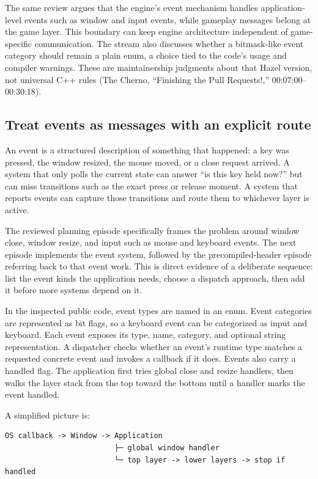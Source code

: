The same review argues that the engine's event mechanism handles application-level events such as window and input events, while gameplay messages belong at the game layer. This boundary can keep engine architecture independent of game-specific communication. The stream also discusses whether a bitmask-like event category should remain a plain enum, a choice tied to the code's usage and compiler warnings. These are maintainership judgments about that Hazel version, not universal C++ rules (The Cherno, ``Finishing the Pull Requests!,'' 00:07:00--00:30:18).

\subsection{Treat events as messages with an explicit route}\label{05-engine-i-ch013-treat-events-as-messages-with-an-explicit-route}

An event is a structured description of something that happened: a key was pressed, the window resized, the mouse moved, or a close request arrived. A system that only polls the current state can answer ``is this key held now?'' but can miss transitions such as the exact press or release moment. A system that reports events can capture those transitions and route them to whichever layer is active.

The reviewed planning episode specifically frames the problem around window close, window resize, and input such as mouse and keyboard events. The next episode implements the event system, followed by the precompiled-header episode referring back to that event work. This is direct evidence of a deliberate sequence: list the event kinds the application needs, choose a dispatch approach, then add it before more systems depend on it.

In the inspected public code, event types are named in an enum. Event categories are represented as bit flags, so a keyboard event can be categorized as input and keyboard. Each event exposes its type, name, category, and optional string representation. A dispatcher checks whether an event's runtime type matches a requested concrete event and invokes a callback if it does. Events also carry a handled flag. The application first tries global close and resize handlers, then walks the layer stack from the top toward the bottom until a handler marks the event handled.

A simplified picture is:

\begin{verbatim}
OS callback -> Window -> Application
                         ├─ global window handler
                         └─ top layer -> lower layers -> stop if handled
\end{verbatim}

